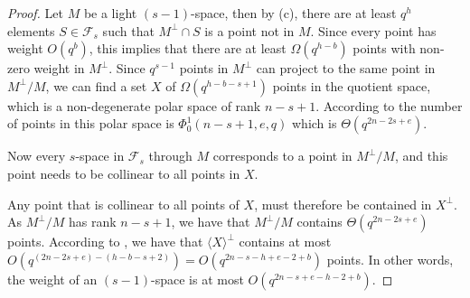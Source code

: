 \documentclass[11pt]{article}
\newcommand{\EKR}{\mathcal{F}}
\renewcommand{\geq}{\geqslant}
\begin{document}
\begin{proof}
    Let $M$ be a light $(s-1)$-space, then by  (c), there are at least $q^h$ elements $S \in \EKR_s$ such that $M^\perp \cap S$ is a point not in $M$. 
    Since every point has weight $O(q^b)$, this implies that there are at least $\Omega(q^{h-b})$ points with non-zero weight in $M^\perp$. 
    Since $q^{s-1}$ points in $M^\perp$ can project to the same point in $M^\perp/M$, we can find a set $X$ of $\Omega(q^{h-b-s+1})$ points in the quotient space, which is a non-degenerate polar space of rank $n-s+1$. According to  the number of points in this polar space is $\Phi_0^1(n-s+1,e,q)$ which is $\Theta(q^{2n-2s+e})$. 
    
    Now every $s$-space in $\EKR_s$ through $M$ corresponds to a point in $M^\perp / M$, and this point needs to be collinear to all points in $X$. %

Any point that is collinear to all points of $X$, must therefore be contained in $X^\perp$. As $M^\perp/M$ has rank $n-s+1$, we have that $M^\perp/M$ contains $\Theta(q^{2n-2s+e})$ points. 
According to , we have that $\langle X \rangle^\perp$ contains at most $O(q^{(2n-2s+e)-(h-b-s+2)})=O(q^{2n-s-h+e-2+b})$ points.
In other words, the weight of an $(s-1)$-space is at most $O(q^{2n-s+e-h-2+b})$. 
\end{proof}




\end{document}
